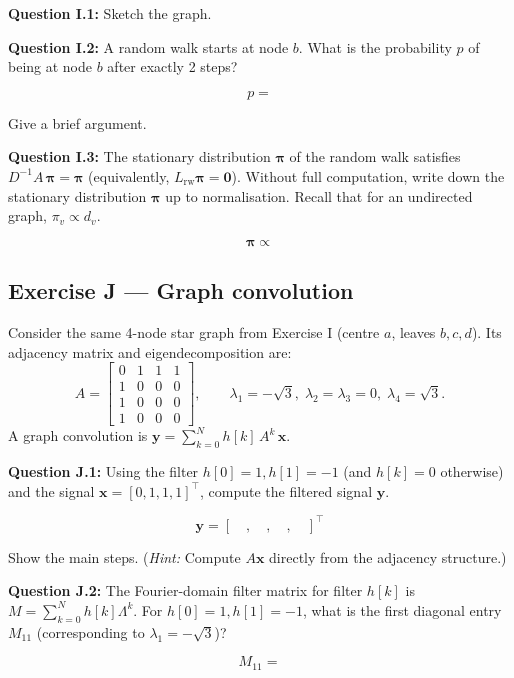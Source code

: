 \documentclass[12pt,a4paper]{article}
\begin{document}
\textbf{Question I.1:} Sketch the graph.

\vspace{3cm}

\textbf{Question I.2:} A random walk starts at node $b$.  What is the probability $p$ of being
at node $b$ after exactly 2 steps?

\[
  p =
\]

Give a brief argument.

\vspace{3cm}

\textbf{Question I.3:} The stationary distribution $\boldsymbol{\pi}$ of the random walk
satisfies $D^{-1}A\,\boldsymbol{\pi}=\boldsymbol{\pi}$ (equivalently, $L_{\mathrm{rw}}\boldsymbol{\pi}=\mathbf{0}$).
Without full computation, write down the stationary distribution $\boldsymbol{\pi}$ up to
normalisation.  Recall that for an undirected graph, $\pi_v\propto d_v$.

\[
  \boldsymbol{\pi} \propto
\]

\vspace{2cm}

\newpage
\subsection*{Exercise J --- Graph convolution}

Consider the same 4-node star graph from Exercise I (centre $a$, leaves $b, c, d$).
Its adjacency matrix and eigendecomposition are:
\[
  A = \begin{bmatrix}0&1&1&1\\1&0&0&0\\1&0&0&0\\1&0&0&0\end{bmatrix},
  \qquad
  \lambda_1=-\sqrt{3},\;\lambda_2=\lambda_3=0,\;\lambda_4=\sqrt{3}.
\]
A graph convolution is $\mathbf{y}=\sum_{k=0}^N h[k]\,A^k\,\mathbf{x}$.

\textbf{Question J.1:} Using the filter $h[0]=1, h[1]=-1$ (and $h[k]=0$ otherwise) and the
signal $\mathbf{x}=[0,1,1,1]^\top$, compute the filtered signal $\mathbf{y}$.

\[
  \mathbf{y} = [\phantom{00},\phantom{00},\phantom{00},\phantom{00}]^\top
\]

Show the main steps.  (\emph{Hint:} Compute $A\mathbf{x}$ directly from the adjacency structure.)

\vspace{5cm}

\textbf{Question J.2:} The Fourier-domain filter matrix for filter $h[k]$ is
$M=\sum_{k=0}^N h[k]\Lambda^k$.  For $h[0]=1, h[1]=-1$, what is the first diagonal entry
$M_{11}$ (corresponding to $\lambda_1=-\sqrt{3}$)?

\[
  M_{11} =
\]
\end{document}
